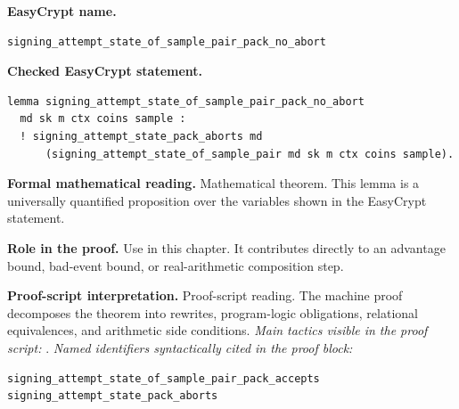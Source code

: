 \begin{formaltheorem}
\noindent\textbf{EasyCrypt name.}
\begin{lstlisting}[language=EasyCrypt,basicstyle=\ttfamily\scriptsize]
signing_attempt_state_of_sample_pair_pack_no_abort
\end{lstlisting}
\noindent\textbf{Checked EasyCrypt statement.}
\begin{lstlisting}[language=EasyCrypt,basicstyle=\ttfamily\scriptsize]
lemma signing_attempt_state_of_sample_pair_pack_no_abort
  md sk m ctx coins sample :
  ! signing_attempt_state_pack_aborts md
      (signing_attempt_state_of_sample_pair md sk m ctx coins sample).
\end{lstlisting}
\noindent\textbf{Formal mathematical reading.}
Mathematical theorem. This lemma is a universally quantified proposition over the variables shown in the EasyCrypt statement.

\noindent\textbf{Role in the proof.}
Use in this chapter. It contributes directly to an advantage bound, bad-event bound, or real-arithmetic composition step.

\noindent\textbf{Proof-script interpretation.}
Proof-script reading. The machine proof decomposes the theorem into rewrites, program-logic obligations, relational equivalences, and arithmetic side conditions.
\emph{Main tactics visible in the proof script:} .
\emph{Named identifiers syntactically cited in the proof block:}
\begin{lstlisting}[language=EasyCrypt,basicstyle=\ttfamily\scriptsize]
signing_attempt_state_of_sample_pair_pack_accepts
signing_attempt_state_pack_aborts
\end{lstlisting}

\end{formaltheorem}

